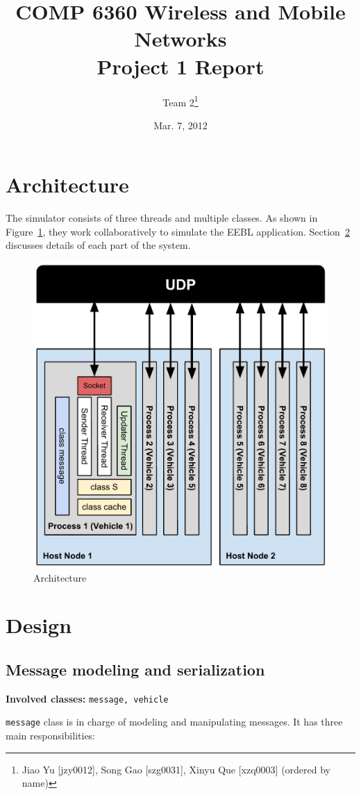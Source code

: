 \documentclass[twocolumn]{article}
\title{COMP 6360 Wireless and Mobile Networks \\ Project 1 Report}
\author{Team 2\thanks{Jiao Yu [jzy0012], Song Gao [szg0031], Xinyu Que [xzq0003] (ordered by name)}}
\date{Mar. 7, 2012}
\begin{document}
\maketitle

\section{Architecture}
\par{The simulator consists of three threads and multiple classes. As shown in Figure~\ref{fig:arch}, they work collaboratively to simulate the EEBL application. Section~\ref{sec:design} discusses details of each part of the system.}
\begin{figure}[htb]
    \includegraphics[width=\columnwidth]{fig_arch.pdf}
    \caption{Architecture}
    \label{fig:arch}
\end{figure}

\section{Design}
\label{sec:design}
\subsection{Message modeling and serialization}
{\bf Involved classes: } {\tt message, vehicle}
\par{{\tt message} class is in charge of modeling and manipulating messages. It has three main responsibilities:}
\end{document}
